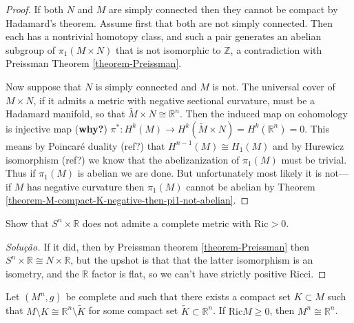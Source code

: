 \begin{proof}
If both $N$ and $M$ are simply connected then they cannot be compact by
Hadamard's theorem. Assume first that both are not simply connected. Then each
has a nontrivial homotopy class, and such a pair generates an abelian subgroup
of $\pi_1(M \times N)$ that is not isomorphic to $\mathbb{Z}$, a contradiction
with Preissman Theorem \ref{theorem-Preissman}.

Now suppose that $N$ is simply connected and $M$ is not. The universal cover of
$M\times N$, if it admits a metric with negative sectional curvature, 
must be a Hadamard manifold, so that $\tilde{M} \times N \cong \mathbb{R}^n$.
Then the induced map on cohomology is injective map ({\bf why?})
$\pi^* :H^{k}(M)\to H^{k}(\tilde{M} \times N)=H^{k}(\mathbb{R}^n)=0$. This means
by Poincaré duality (ref?) that $H^{n-1}(M)\cong H_1(M)$ and by Hurewicz
isomorphism (ref?) we know that the abelizanization of $\pi_1(M)$ must be
trivial. Thus if $\pi_1(M)$ is abelian we are done. But unfortunately most
likely it is not--- if $M$ has negative curvature then $\pi_{1}(M)$ cannot be
abelian by Theorem \ref{theorem-M-compact-K-negative-then-pi1-not-abelian}. 
\end{proof}

\begin{exercise}
\label{exercise-SnxR-no-positive-Ric}
Show that $S^n \times \mathbb{R}$ does not admite a complete metric with
$\text{Ric}>0$.
\end{exercise}

\begin{proof}[Solução]
If it did, then by Preissman theorem \ref{theorem-Preissman} then $S^n\times
\mathbb{R}\cong N \times \mathbb{R}$, but the upshot is that that the latter 
isomorphism is an isometry, and the $\mathbb{R}$ factor is flat, so we can't 
have strictly positive Ricci.
\end{proof}

\begin{exercise}
\label{exercise-complete-without-a-compact-set-isometric-to-Rn}
Let $(M^n,g)$ be complete and such that there exists a compact set
 $K\subset M$ such that $M\setminus K \cong \mathbb{R}^n \setminus \tilde{K}$
for some compact set $\tilde{K} \subset \mathbb{R}^n$. If $\text{Ric}M \geq 0$,
then $M^n \cong \mathbb{R}^n$.
\end{exercise}

